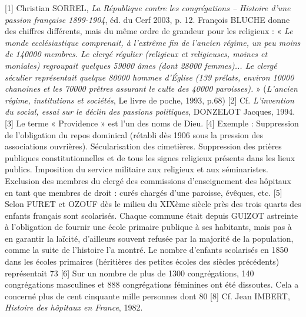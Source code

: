 [1] Christian SORREL, \emph{La République contre les congrégations – Histoire d'une passion française 1899-1904}, éd. du Cerf 2003, p. 12. François BLUCHE donne des chiffres différents, mais du même ordre de grandeur pour les religieux : « \emph{ Le monde ecclésiastique comprenait, à l'extrême fin de l'ancien régime, un peu moins de 140000 membres. Le clergé régulier (religieux et religieuses, moines et moniales) regroupait quelques 59000 âmes (dont 28000 femmes)... Le clergé séculier représentait quelque 80000 hommes d'Église (139 prélats, environ 10000 chanoines et les 70000 prêtres assurant le culte des 40000 paroisses).} » (\emph{L'ancien régime, institutions et sociétés}, Le livre de poche, 1993, p.68)
[2] Cf. \emph{L'invention du social, essai sur le déclin des passions politiques}, DONZELOT Jacques, 1994.
[3] Le terme « Providence » est l'un des noms de Dieu.
[4] Exemple : Suppression de l'obligation du repos dominical (rétabli dès 1906 sous la pression des associations ouvrières). Sécularisation des cimetières. Suppression des prières publiques constitutionnelles et de tous les signes religieux présents dans les lieux publics. Imposition du service militaire aux religieux et aux séminaristes. Exclusion des membres du clergé des commissions d'enseignement des hôpitaux en tant que membres de droit : curés chargés d'une paroisse, évêques, etc.
[5] Selon FURET et OZOUF dès le milieu du XIXème siècle près des trois quarts des enfants français sont scolarisés. Chaque commune était depuis GUIZOT astreinte à l'obligation de fournir une école primaire publique à ses habitants, mais pas à en garantir la laïcité, d'ailleurs souvent refusée par la majorité de la population, comme la suite de l'histoire l'a montré. Le nombre d'enfants scolarisés en 1850 dans les écoles primaires (héritières des petites écoles des siècles précédents) représentait 73 %
[6] Sur un nombre de plus de 1300 congrégations, 140 congrégations masculines et 888 congrégations féminines ont été dissoutes. Cela a concerné plus de cent cinquante mille personnes dont 80%
[8] Cf. Jean IMBERT, \emph{Histoire des hôpitaux en France}, 1982.
